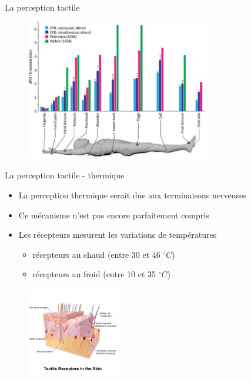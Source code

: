 \documentclass[compress, noflama]{beamer}
\begin{document}
{
\begin{frame}{La perception tactile}
\begin{figure}
\centering
\includegraphics[width=8cm]{images/tactile_acuity}
\end{figure}
\end{frame}
}

{
\begin{frame}{La perception tactile - thermique}
\begin{itemize}
\item La perception thermique serait due aux terminaisons nerveuses
\item Ce mécanisme n'est pas encore parfaitement compris
\item Les récepteurs mesurent les variations de températures
\begin{itemize}
\item récepteurs au chaud (entre 30 et 46 $^{\circ}C$)
\item récepteurs au froid (entre 10 et 35 $^{\circ}C$)
\end{itemize}
\end{itemize}
\begin{figure}
\centering
\includegraphics[width=4cm]{images/tactileReceptors}
\end{figure}
\end{frame}
}
\end{document}
